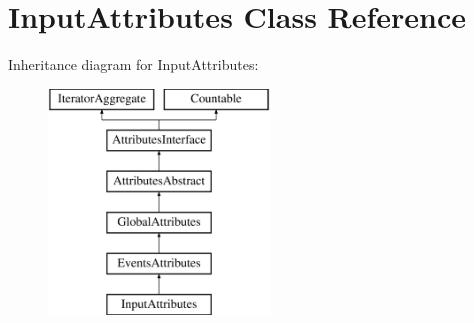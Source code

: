 \hypertarget{class_pes_1_1_dom_1_1_node_1_1_attributes_1_1_input_attributes}{}\section{Input\+Attributes Class Reference}
\label{class_pes_1_1_dom_1_1_node_1_1_attributes_1_1_input_attributes}
Inheritance diagram for Input\+Attributes\+:\begin{figure}[H]
\begin{center}
\leavevmode
\includegraphics[height=6.000000cm]{class_pes_1_1_dom_1_1_node_1_1_attributes_1_1_input_attributes}
\end{center}
\end{figure}
